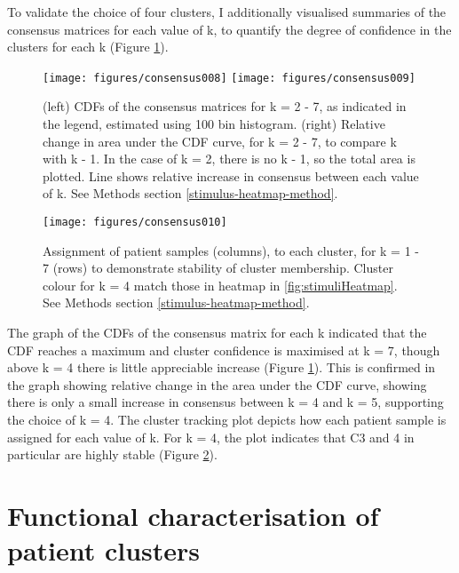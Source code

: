 \documentclass[11pt, a4paper, twosided]{book}
\begin{document}
To validate the choice of four clusters, I additionally visualised summaries of the consensus matrices for each value of k, to quantify the degree of confidence in the clusters for each k (Figure \ref{fig:consensusClusteringA}).


\begin{figure}

{\centering \texttt{[image: figures/consensus008]} \texttt{[image: figures/consensus009]} 

}

\caption{(left) CDFs of the consensus matrices for k = 2 - 7, as indicated in the legend, estimated using 100 bin histogram. (right) Relative change in area under the CDF curve, for k = 2 - 7, to compare k with k - 1. In the case of k = 2, there is no k - 1, so the total area is plotted. Line shows relative increase in consensus between each value of k. See Methods section \ref{stimulus-heatmap-method}.}\label{fig:consensusClusteringA}
\end{figure}

\begin{figure}

{\centering \texttt{[image: figures/consensus010]} 

}

\caption{Assignment of patient samples (columns), to each cluster, for k = 1 - 7 (rows) to demonstrate stability of cluster membership. Cluster colour for k = 4 match those in heatmap in \ref{fig:stimuliHeatmap}. See Methods section \ref{stimulus-heatmap-method}.}\label{fig:consensusClusteringB}
\end{figure}
The graph of the CDFs of the consensus matrix for each k indicated that the CDF reaches a maximum and cluster confidence is maximised at k = 7, though above k = 4 there is little appreciable increase (Figure \ref{fig:consensusClusteringA}). This is confirmed in the graph showing relative change in the area under the CDF curve, showing there is only a small increase in consensus between k = 4 and k = 5, supporting the choice of k = 4. The cluster tracking plot depicts how each patient sample is assigned for each value of k. For k = 4, the plot indicates that C3 and 4 in particular are highly stable (Figure \ref{fig:consensusClusteringB}).

\hypertarget{functional-characterisation-of-patient-clusters}{%
\section{Functional characterisation of patient clusters}\label{functional-characterisation-of-patient-clusters}}
\end{document}
